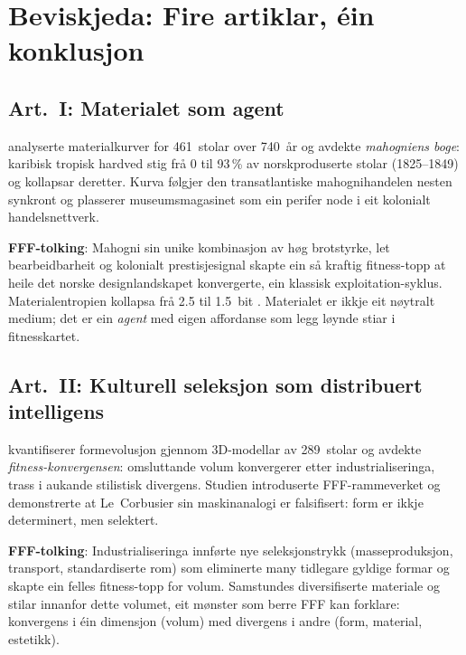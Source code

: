 \documentclass[12pt,a4paper]{article}
\begin{document}
\section{Beviskjeda: Fire artiklar, \'{e}in konklusjon}
\label{sec:bevis}

\subsection{Art.~I: Materialet som agent}

\citet{finne2026a} analyserte materialkurver for 461~stolar over 740~\aa{}r og avdekte \emph{mahogniens boge}: karibisk tropisk hardved stig fr\aa{} 0 til 93\,\% av norskproduserte stolar (1825--1849) og kollapsar deretter. Kurva f\o{}lgjer den transatlantiske mahognihandelen nesten synkront og plasserer museumsmagasinet som ein perifer node i eit kolonialt handelsnettverk.

\textbf{FFF-tolking}: Mahogni sin unike kombinasjon av h\o{}g brotstyrke, let bearbeidbarheit og kolonialt prestisjesignal skapte ein s\aa{} kraftig fitness-topp at heile det norske designlandskapet konvergerte, ein klassisk exploitation-syklus. Materialentropien kollapsa fr\aa{} 2.5 til 1.5~bit \citep{finne2026d}. Materialet er ikkje eit n\o{}ytralt medium; det er ein \emph{agent} med eigen affordanse \citep{gibson1977, ingold2007} som legg l\o{}ynde stiar i fitnesskartet.

\subsection{Art.~II: Kulturell seleksjon som distribuert intelligens}

\citet{finne2026b} kvantifiserer formevolusjon gjennom 3D-modellar av 289~stolar og avdekte \emph{fitness-konvergensen}: omsluttande volum konvergerer etter industrialiseringa, trass i aukande stilistisk divergens. Studien introduserte FFF-rammeverket og demonstrerte at Le~Corbusier sin maskinanalogi er falsifisert: form er ikkje determinert, men selektert.

\textbf{FFF-tolking}: Industrialiseringa innf\o{}rte nye seleksjonstrykk (masseproduksjon, transport, standardiserte rom) som eliminerte many tidlegare gyldige formar og skapte ein felles fitness-topp for volum. Samstundes diversifiserte materiale og stilar innanfor dette volumet, eit m\o{}nster som berre FFF kan forklare: konvergens i \'{e}in dimensjon (volum) med divergens i andre (form, material, estetikk).
\end{document}
